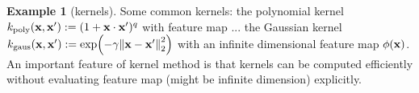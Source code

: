 \documentclass[
10pt,
aps,
pra,
linenumbers,
floatfix,
]{revtex4-2}
\theoremstyle{plain}
\theoremstyle{definition}
\newtheorem{example}{Example}
\newcommand{\kernel}{k}
\newcommand{\shadow}{\text{shadow}}
\newcommand{\U}{\hat{U}}
\begin{document}
\begin{example}[kernels]
	Some common kernels: 
	the polynomial kernel $\kernel_{\text{poly}}(\vbx,\vbx') := (1+\vbx\cdot\vbx')^q$ with feature map ...
	the Gaussian kernel
	$\kernel_{\text{gaus}}(\vbx,\vbx') := \exp(-\gamma\norm{\vbx-\vbx'}^2_2)$ 
	with an infinite dimensional feature map $\phi(\vb{x})$.
	An important feature of kernel method is that kernels can be computed efficiently without evaluating feature map (might be infinite dimension) explicitly.




\end{example}
\end{document}
